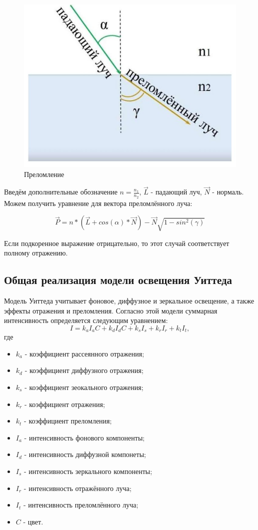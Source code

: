 \documentclass[12pt,a4paper,oneside]{report}
\begin{document}
				\begin{figure}[htp]
					\centering
					\includegraphics[scale=0.2]{refract}
					\caption{Преломление}
					\label{fig:refract}
				\end{figure}
				
				Введём дополнительные обозначение $n = \frac{n_{1}}{n_{2}}$, $\vec{L}$ - падающий луч, $\vec{N}$ - нормаль. Можем получить уравнение для вектора преломлённого луча:
				
				\[
    				\vec{P} = n*(\vec{L} + cos(\alpha)*\vec{N}) - \vec{N}\sqrt{1 - sin^2(\gamma)}
				\]
				
				Если подкоренное выражение отрицательно, то этот случай соответствует полному отражению.	
			\subsection{Общая реализация модели освещения Уиттеда}
				\quad Модель Уиттеда учитывает фоновое, диффузное и зеркальное освещение, а также эффекты отражения и преломления. Согласно этой модели суммарная интенсивность определяется следующим уравнением:
				\[
    				I = k_{a}I_{a}C + k_{d}I_{d}C + k_{s}I_{s} + k_{r}I_{r} + k_{t}I_{t},
				\]
				где 
				\begin{itemize}
    				\item $k_{a}$ - коэффициент рассеянного отражения;
    				\item $k_{d}$ - коэффициент диффузного отражения;
    				\item $k_{s}$ - коэффициент зеокального отражения;
    				\item $k_{r}$ - коэффициент отражения;
    				\item $k_{t}$ - коэффициент преломления;
    				\item $I_{a}$ - интенсивность фонового компоненты;
    				\item $I_{d}$ - интенсивность диффузной компонеты;
    				\item $I_{s}$ - интенсивность зеркального компоненты;
    				\item $I_{r}$ - интенсивность отражённого луча;
    				\item $I_{t}$ - интенсивность преломлённого луча;
    				\item $C$ - цвет.
    			\end{itemize}
\end{document}
